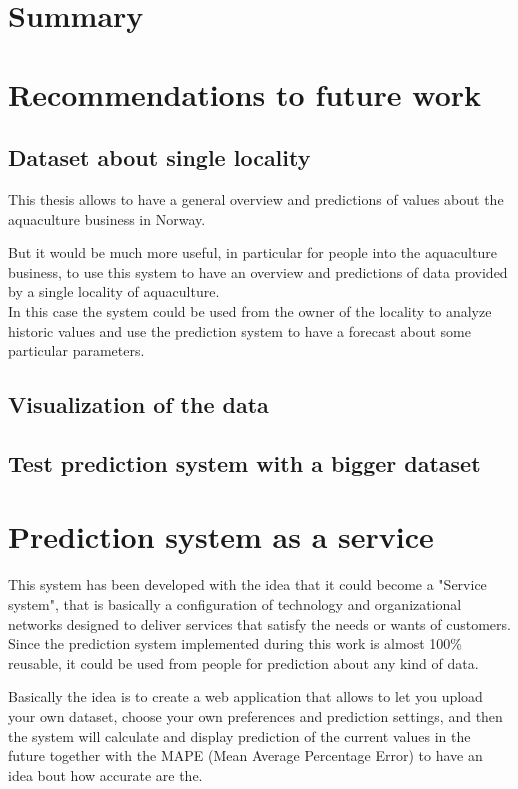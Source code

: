 
\section{Summary}

\section{Recommendations to future work}

\subsection{Dataset about single locality}
This thesis allows to have a general overview and predictions of values about the aquaculture business in Norway. 

But it would be much more useful, in particular for people into the aquaculture business, to use this system to have an overview and predictions of data provided by a single locality of aquaculture.\\
In this case the system could be used from the owner of the locality to analyze historic values and use the prediction system to have a forecast about some particular parameters.

\subsection{Visualization of the data}

\subsection{Test prediction system with a bigger dataset}

\section{Prediction system as a service}
This system has been developed with the idea that it could become a "Service system", that is basically a configuration of technology and organizational networks designed to deliver services that satisfy the needs or wants of customers.
Since the prediction system implemented during this work is almost 100\% reusable, it could be used from people for prediction about any kind of data. 

Basically the idea is to create a web application that allows to let you upload your own dataset, choose your own preferences and prediction settings, and then the system will calculate and display prediction of the current values in the future together with the MAPE (Mean Average Percentage Error) to have an idea bout how accurate are the.\\


